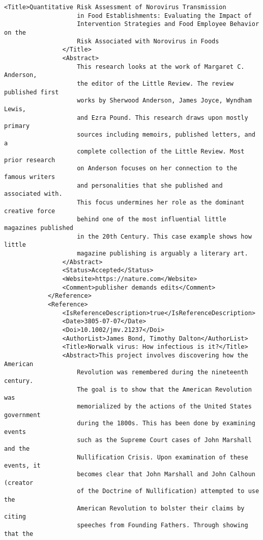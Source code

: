 \documentclass[a4paper]{report}
\begin{document}
\begin{lstlisting}[language=RAKIP, caption={Example of StudySample}]
                <Title>Quantitative Risk Assessment of Norovirus Transmission
                    in Food Establishments: Evaluating the Impact of
                    Intervention Strategies and Food Employee Behavior on the
                    Risk Associated with Norovirus in Foods
                </Title>
                <Abstract>
                    This research looks at the work of Margaret C. Anderson,
                    the editor of the Little Review. The review published first
                    works by Sherwood Anderson, James Joyce, Wyndham Lewis,
                    and Ezra Pound. This research draws upon mostly primary
                    sources including memoirs, published letters, and a
                    complete collection of the Little Review. Most prior research
                    on Anderson focuses on her connection to the famous writers
                    and personalities that she published and associated with.
                    This focus undermines her role as the dominant creative force
                    behind one of the most influential little magazines published
                    in the 20th Century. This case example shows how little
                    magazine publishing is arguably a literary art.
                </Abstract>
                <Status>Accepted</Status>
                <Website>https://nature.com</Website>
                <Comment>publisher demands edits</Comment>
            </Reference>
            <Reference>
                <IsReferenceDescription>true</IsReferenceDescription>
                <Date>3805-07-07</Date>
                <Doi>10.1002/jmv.21237</Doi>
                <AuthorList>James Bond, Timothy Dalton</AuthorList>
                <Title>Norwalk virus: How infectious is it?</Title>
                <Abstract>This project involves discovering how the American
                    Revolution was remembered during the nineteenth century.
                    The goal is to show that the American Revolution was
                    memorialized by the actions of the United States government
                    during the 1800s. This has been done by examining events
                    such as the Supreme Court cases of John Marshall and the
                    Nullification Crisis. Upon examination of these events, it
                    becomes clear that John Marshall and John Calhoun (creator
                    of the Doctrine of Nullification) attempted to use the
                    American Revolution to bolster their claims by citing
                    speeches from Founding Fathers. Through showing that the

\end{lstlisting}
\end{document}
